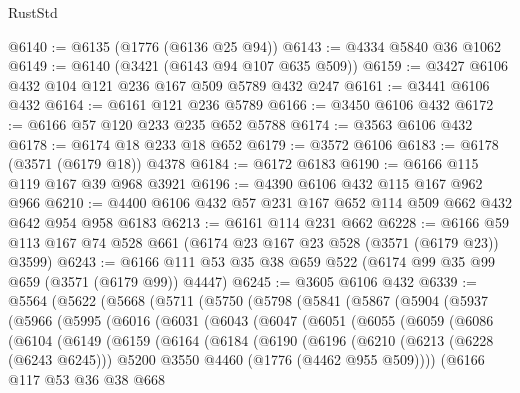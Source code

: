 \begin{lexlean}{RustStd}
\begin{coremodule}
@6140 := @6135 (@1776 (@6136 @25 @94))
@6143 := @4334 @5840 @36 @1062
@6149 := @6140 (@3421 (@6143 @94 @107 @635 @509))
@6159 := @3427 @6106 @432 @104 @121 @236 @167 @509 @5789 @432 @247
@6161 := @3441 @6106 @432
@6164 := @6161 @121 @236 @5789
@6166 := @3450 @6106 @432
@6172 := @6166 @57 @120 @233 @235 @652 @5788
@6174 := @3563 @6106 @432
@6178 := @6174 @18 @233 @18 @652
@6179 := @3572 @6106
@6183 := @6178 (@3571 (@6179 @18)) @4378
@6184 := @6172 @6183
@6190 := @6166 @115 @119 @167 @39 @968 @3921
@6196 := @4390 @6106 @432 @115 @167 @962 @966
@6210 := @4400 @6106 @432 @57 @231 @167 @652 @114 @509 @662 @432 @642 @954 @958 @6183
@6213 := @6161 @114 @231 @662
@6228 := @6166 @59 @113 @167 @74 @528 @661 (@6174 @23 @167 @23 @528 (@3571 (@6179 @23)) @3599)
@6243 := @6166 @111 @53 @35 @38 @659 @522 (@6174 @99 @35 @99 @659 (@3571 (@6179 @99)) @4447)
@6245 := @3605 @6106 @432
@6339 := @5564
    (@5622
      (@5668
        (@5711
          (@5750
            (@5798
              (@5841
                (@5867
                  (@5904
                    (@5937
                      (@5966
                        (@5995
                          (@6016
                            (@6031
                              (@6043
                                (@6047
                                  (@6051
                                    (@6055
                                      (@6059
                                        (@6086
                                          (@6104
                                            (@6149
                                              (@6159
                                                (@6164
                                                  (@6184
                                                    (@6190
                                                      (@6196
                                                        (@6210
                                                          (@6213 (@6228 (@6243 @6245)))
                                                          @5200
                                                          @3550
                                                          @4460
                                                          (@1776 (@4462 @955 @509))))
                                                      (@6166
                                                        @117
                                                        @53
                                                        @36
                                                        @38
                                                        @668

\end{coremodule}
\end{lexlean}
